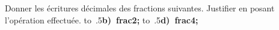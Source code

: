 \documentclass[exercice]{thedocument}%
\begin{document}
%
Donner les écritures décimales des fractions suivantes. Justifier en posant
l'opération effectuée.\vskip10pt
\hbox{\hbox to .5\hbox{{\bfseries b) \<frac2;\hfill}}}\vskip10pt
\hbox{\hbox to .5\hbox{{\bfseries d) \<frac4;\hfill}}}
\end{document}
